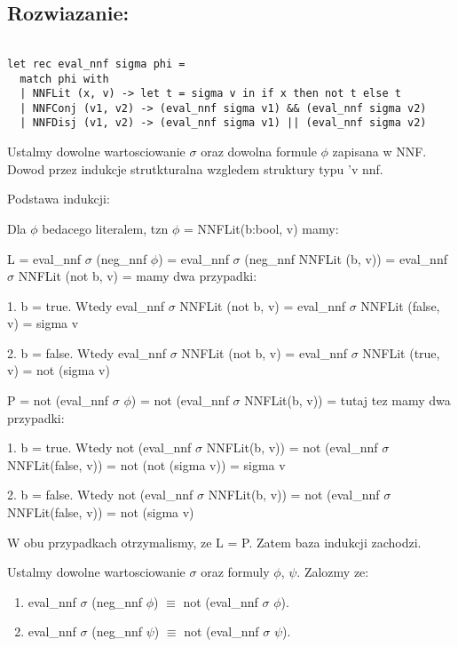 \documentclass{article}
\begin{document}
\subsection{Rozwiazanie:}

\begin{lstlisting}

let rec eval_nnf sigma phi =
  match phi with
  | NNFLit (x, v) -> let t = sigma v in if x then not t else t
  | NNFConj (v1, v2) -> (eval_nnf sigma v1) && (eval_nnf sigma v2)
  | NNFDisj (v1, v2) -> (eval_nnf sigma v1) || (eval_nnf sigma v2)

\end{lstlisting}

Ustalmy dowolne wartosciowanie $\sigma$ oraz dowolna formule $\phi$ zapisana w NNF. Dowod przez indukcje strutkturalna wzgledem struktury typu 'v nnf.

Podstawa indukcji:

Dla $\phi$ bedacego literalem, tzn $\phi$ = NNFLit(b:bool, v) mamy:

L = eval\_nnf $\sigma$ (neg\_nnf $\phi$) = eval\_nnf $\sigma$ (neg\_nnf NNFLit (b, v)) = eval\_nnf $\sigma$ NNFLit (not b, v) = mamy dwa przypadki:

1. b = true. Wtedy eval\_nnf $\sigma$ NNFLit (not b, v) = eval\_nnf $\sigma$ NNFLit (false, v) = sigma v 

2. b = false.  Wtedy eval\_nnf $\sigma$ NNFLit (not b, v) = eval\_nnf $\sigma$ NNFLit (true, v) = not (sigma v) 

P = not (eval\_nnf $\sigma$ $\phi$) = not (eval\_nnf $\sigma$ NNFLit(b, v)) = tutaj tez mamy dwa przypadki:

1. b = true. Wtedy not (eval\_nnf $\sigma$ NNFLit(b, v)) = not (eval\_nnf $\sigma$ NNFLit(false, v)) = not (not (sigma v)) = sigma v

2. b = false. Wtedy not (eval\_nnf $\sigma$ NNFLit(b, v)) =  not (eval\_nnf $\sigma$ NNFLit(false, v)) = not (sigma v)

W obu przypadkach otrzymalismy, ze L = P. Zatem baza indukcji zachodzi.

Ustalmy dowolne wartosciowanie $\sigma$ oraz formuly $\phi$, $\psi$. Zalozmy ze:

\begin{enumerate}[label=(\arabic*)]

\item eval\_nnf $\sigma$ (neg\_nnf $\phi$) $\equiv$ not (eval\_nnf $\sigma$ $\phi$).

\item eval\_nnf $\sigma$ (neg\_nnf $\psi$) $\equiv$ not (eval\_nnf $\sigma$ $\psi$).

\end{enumerate}
\end{document}

